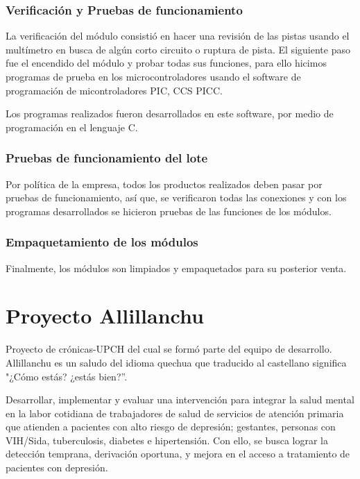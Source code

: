 \subsubsection{Verificación y Pruebas de funcionamiento}
La verificación del módulo consistió en hacer una revisión de las pistas usando el multímetro en busca de algún corto circuito o ruptura de pista. El siguiente paso fue el encendido del módulo y probar todas sus funciones, para ello hicimos programas de prueba en los microcontroladores usando el software de programación de micontroladores PIC, CCS PICC.

Los programas realizados fueron desarrollados en este software, por medio de programación en el lenguaje C.

\subsubsection{Pruebas de funcionamiento del lote}
Por política de la empresa, todos los productos realizados deben pasar por pruebas de funcionamiento, así que, se verificaron todas las conexiones y con los programas desarrollados se hicieron pruebas de las funciones de los módulos.

\subsubsection{Empaquetamiento de los módulos}
Finalmente, los módulos son limpiados y empaquetados para su posterior venta.


\section{Proyecto Allillanchu}
Proyecto de crónicas-UPCH del cual se formó parte del equipo de desarrollo. Allillanchu es un saludo del idioma quechua que traducido al castellano significa "¿Cómo estás? ¿estás bien?”.

Desarrollar, implementar y evaluar una intervención para integrar la salud mental en la labor cotidiana de trabajadores de salud de servicios de atención primaria que atienden a pacientes con alto riesgo de depresión; gestantes, personas con VIH/Sida, tuberculosis, diabetes e hipertensión. Con ello, se busca lograr la detección temprana, derivación oportuna, y mejora en el acceso a tratamiento de pacientes con depresión.

